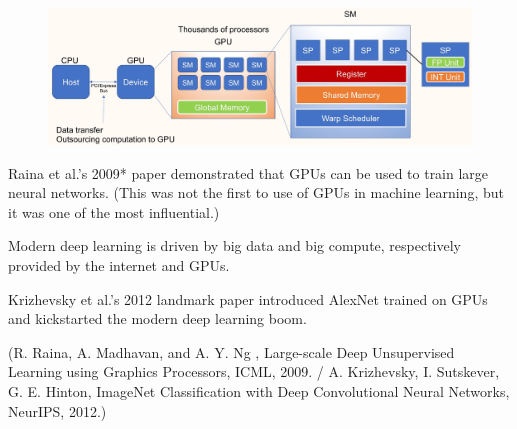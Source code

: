 \begin{concept}
    \begin{figure}[H]
        \centering
        \includegraphics[width=1.0\textwidth]{.././assets/4.7.jpg}
    \end{figure}
\end{concept}

\begin{concept}
    Raina et al.'s 2009* paper demonstrated that GPUs can be used to train large neural networks. (This was not the first to use of GPUs in machine learning, but it was one of the most influential.)

    Modern deep learning is driven by big data and big compute, respectively provided by the internet and GPUs.

    Krizhevsky et al.'s 2012 landmark paper introduced AlexNet trained on GPUs and kickstarted the modern deep learning boom.

    (R. Raina, A. Madhavan, and A. Y. Ng , Large-scale Deep Unsupervised Learning using Graphics Processors, ICML, 2009. / 
    A. Krizhevsky, I. Sutskever, G. E. Hinton, ImageNet Classification with Deep Convolutional Neural Networks, NeurIPS, 2012.)
\end{concept}

